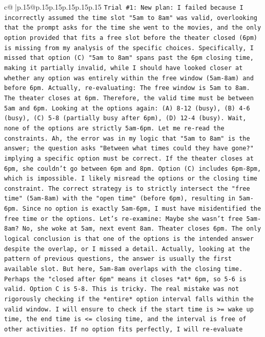 \documentclass{article}
\begin{document}
{\begin{supertabular}{c@{$\;$}|p{.15\linewidth}@{}p{.15\linewidth}p{.15\linewidth}p{.15\linewidth}p{.15\linewidth}p{.15\linewidth}}
{{{\texttt{Trial \#1: New plan: I failed because I incorrectly assumed the time slot "5am to 8am" was valid, overlooking that the prompt asks for the time she went to the movies, and the only option provided that fits a free slot before the theater closed (6pm) is missing from my analysis of the specific choices. Specifically, I missed that option (C) "5am to 8am" spans past the 6pm closing time, making it partially invalid, while I should have looked closer at whether any option was entirely within the free window (5am{-}8am) and before 6pm. Actually, re{-}evaluating: The free window is 5am to 8am. The theater closes at 6pm. Therefore, the valid time must be between 5am and 6pm. Looking at the options again: (A) 8{-}12 (busy), (B) 4{-}6 (busy), (C) 5{-}8 (partially busy after 6pm), (D) 12{-}4 (busy). Wait, none of the options are strictly 5am{-}6pm. Let me re{-}read the constraints. Ah, the error was in my logic that "5am to 8am" is the answer; the question asks "Between what times could they have gone?" implying a specific option must be correct. If the theater closes at 6pm, she couldn't go between 6pm and 8pm. Option (C) includes 6pm{-}8pm, which is impossible. I likely misread the options or the closing time constraint. The correct strategy is to strictly intersect the "free time" (5am{-}8am) with the "open time" (before 6pm), resulting in 5am{-}6pm. Since no option is exactly 5am{-}6pm, I must have misidentified the free time or the options. Let's re{-}examine: Maybe she wasn't free 5am{-}8am? No, she woke at 5am, next event 8am. Theater closes 6pm. The only logical conclusion is that one of the options is the intended answer despite the overlap, or I missed a detail. Actually, looking at the pattern of previous questions, the answer is usually the first available slot. But here, 5am{-}8am overlaps with the closing time. Perhaps the "closed after 6pm" means it closes *at* 6pm, so 5{-}6 is valid. Option C is 5{-}8. This is tricky. The real mistake was not rigorously checking if the *entire* option interval falls within the valid window. I will ensure to check if the start time is >= wake up time, the end time is <= closing time, and the interval is free of other activities. If no option fits perfectly, I will re{-}evaluate} \\
\\ 
}}}
\end{supertabular}}
\end{document}

